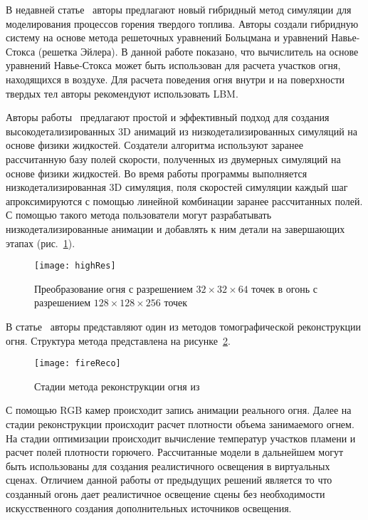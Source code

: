 В недавней статье~\cite{Jo2019LatticeBoltzmannAE} авторы предлагают новый
гибридный метод симуляции для моделирования процессов горения твердого топлива.
Авторы создали гибридную систему на основе метода решеточных уравнений Больцмана
и уравнений Навье-Стокса (решетка Эйлера). В данной работе показано, что
вычислитель на основе уравнений Навье-Стокса может быть использован для расчета
участков огня, находящихся в воздухе. Для расчета поведения огня внутри и на
поверхности твердых тел авторы рекомендуют использовать LBM\@.

Авторы работы~\cite{Sato2012ADA} предлагают простой и эффективный подход для
создания высокодетализированных 3D анимаций из низкодетализированных симуляций
на основе физики жидкостей. Создатели алгоритма используют заранее рассчитанную
базу полей скорости, полученных из двумерных симуляций на основе физики
жидкостей. Во время работы программы выполняется низкодетализированная 3D
симуляция, поля скоростей симуляции каждый шаг апроксимируются с помощью
линейной комбинации заранее рассчитанных полей. С помощью такого метода
пользователи могут разрабатывать низкодетализированные анимации и добавлять к
ним детали на завершающих этапах (рис.~\ref{fig:highRes}).
\begin{figure}[htb]
	\centering
    \texttt{[image: highRes]}
    \caption{Преобразование огня с разрешением $32 \times 32 \times 64$ точек в
    огонь с разрешением $128 \times 128 \times 256$ точек}%
    \label{fig:highRes}
\end{figure}

В статье~\cite{MultiView} авторы представляют один из методов томографической
реконструкции огня. Структура метода представлена на рисунке~\ref{fig:fireReco}.
\begin{figure}[htb]
	\centering
    \texttt{[image: fireReco]}
    \caption{Стадии метода реконструкции огня из~\cite{MultiView}}%
    \label{fig:fireReco}
\end{figure}
С помощью RGB камер происходит запись анимации реального огня. Далее на стадии
реконструкции происходит расчет плотности объема занимаемого огнем. На стадии
оптимизации происходит вычисление температур участков пламени и расчет полей
плотности горючего. Рассчитанные модели в дальнейшем могут быть использованы для
создания реалистичного освещения в виртуальных сценах. Отличием данной работы от
предыдущих решений является то что созданный огонь дает реалистичное освещение
сцены без необходимости искусственного создания дополнительных источников
освещения.


